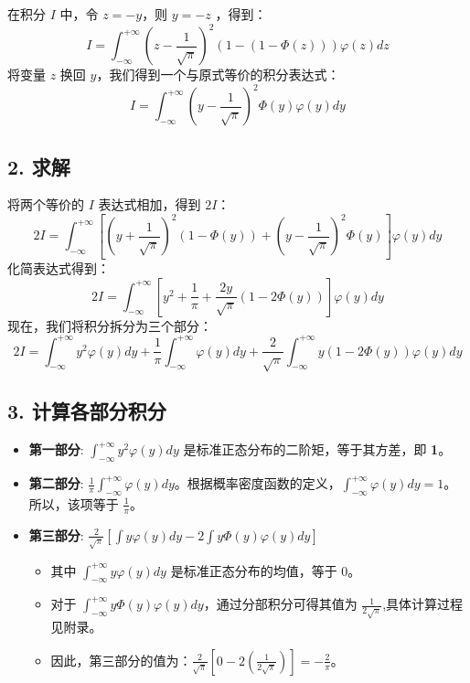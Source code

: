 \documentclass[UTF8]{ctexart}
\begin{document}
在积分 $I$ 中，令 $z = -y$，则 $y = -z$ ，得到：
$$ I = \int_{-\infty}^{+\infty}{\left(z-\frac{1}{\sqrt{\pi}}\right)^{2}(1-(1-\Phi(z)))\varphi(z)dz} $$
将变量 $z$ 换回 $y$，我们得到一个与原式等价的积分表达式：
$$ I = \int_{-\infty}^{+\infty}{\left(y-\frac{1}{\sqrt{\pi}}\right)^{2}\Phi(y)\varphi(y)dy} $$

\subsection*{2. 求解}
将两个等价的 $I$ 表达式相加，得到 $2I$：
$$ 2I = \int_{-\infty}^{+\infty} \left[ \left(y+\frac{1}{\sqrt{\pi}}\right)^{2}(1-\Phi(y)) + \left(y-\frac{1}{\sqrt{\pi}}\right)^{2}\Phi(y) \right] \varphi(y)dy $$
化简表达式得到：
$$ 2I = \int_{-\infty}^{+\infty} \left[ y^2 + \frac{1}{\pi} + \frac{2y}{\sqrt{\pi}}(1-2\Phi(y)) \right] \varphi(y)dy $$
现在，我们将积分拆分为三个部分：
$$ 2I = \int_{-\infty}^{+\infty} y^2 \varphi(y)dy + \frac{1}{\pi}\int_{-\infty}^{+\infty}\varphi(y)dy + \frac{2}{\sqrt{\pi}}\int_{-\infty}^{+\infty} y(1-2\Phi(y))\varphi(y)dy $$

\subsection*{3. 计算各部分积分}
\begin{itemize}
    \item \textbf{第一部分}: $\int_{-\infty}^{+\infty} y^2 \varphi(y)dy$ 是标准正态分布的二阶矩，等于其方差，即 \textbf{1}。
    \item \textbf{第二部分}: $\frac{1}{\pi}\int_{-\infty}^{+\infty}\varphi(y)dy$。根据概率密度函数的定义，$\int_{-\infty}^{+\infty}\varphi(y)dy=1$。所以，该项等于 \textbf{$\frac{1}{\pi}$}。
    \item \textbf{第三部分}: $\frac{2}{\sqrt{\pi}} \left[ \int y\varphi(y)dy - 2\int y\Phi(y)\varphi(y)dy \right]$
        \begin{itemize}
            \item 其中 $\int_{-\infty}^{+\infty} y\varphi(y)dy$ 是标准正态分布的均值，等于 0。
            \item 对于 $\int_{-\infty}^{+\infty} y\Phi(y)\varphi(y)dy$，通过分部积分可得其值为 $\frac{1}{2\sqrt{\pi}}$,具体计算过程见附录。
    
            \item 因此，第三部分的值为：$\frac{2}{\sqrt{\pi}} \left[ 0 - 2 \left( \frac{1}{2\sqrt{\pi}} \right) \right] = -\frac{2}{\pi}$。
        \end{itemize}
\end{itemize}
\end{document}
